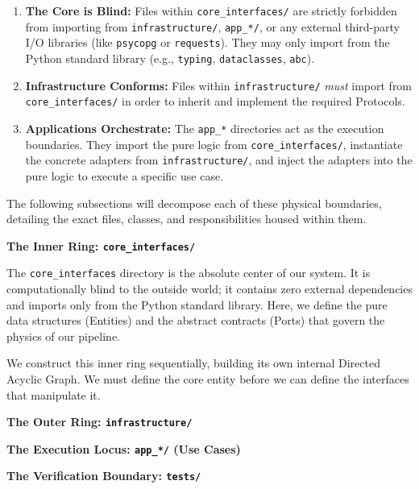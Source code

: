 \begin{enumerate}
    \item \textbf{The Core is Blind:} Files within \texttt{core\_interfaces/} are strictly forbidden from importing from \texttt{infrastructure/}, \texttt{app\_*/}, or any external third-party I/O libraries (like \texttt{psycopg} or \texttt{requests}). They may only import from the Python standard library (e.g., \texttt{typing}, \texttt{dataclasses}, \texttt{abc}).
    \item \textbf{Infrastructure Conforms:} Files within \texttt{infrastructure/} \textit{must} import from \texttt{core\_interfaces/} in order to inherit and implement the required Protocols.
    \item \textbf{Applications Orchestrate:} The \texttt{app\_*} directories act as the execution boundaries. They import the pure logic from \texttt{core\_interfaces/}, instantiate the concrete adapters from \texttt{infrastructure/}, and inject the adapters into the pure logic to execute a specific use case.
\end{enumerate}

The following subsections will decompose each of these physical boundaries, detailing the exact files, classes, and responsibilities housed within them.


\textbf{The Inner Ring: \texttt{core\_interfaces/}}

The \texttt{core\_interfaces} directory is the absolute center of our system. It is computationally blind to the outside world; it contains zero external dependencies and imports only from the Python standard library. Here, we define the pure data structures (Entities) and the abstract contracts (Ports) that govern the physics of our pipeline.

We construct this inner ring sequentially, building its own internal Directed Acyclic Graph. We must define the core entity before we can define the interfaces that manipulate it.



\textbf{The Outer Ring: \texttt{infrastructure/}}


\textbf{The Execution Locus: \texttt{app\_*/} (Use Cases)}

\textbf{The Verification Boundary: \texttt{tests/}}
